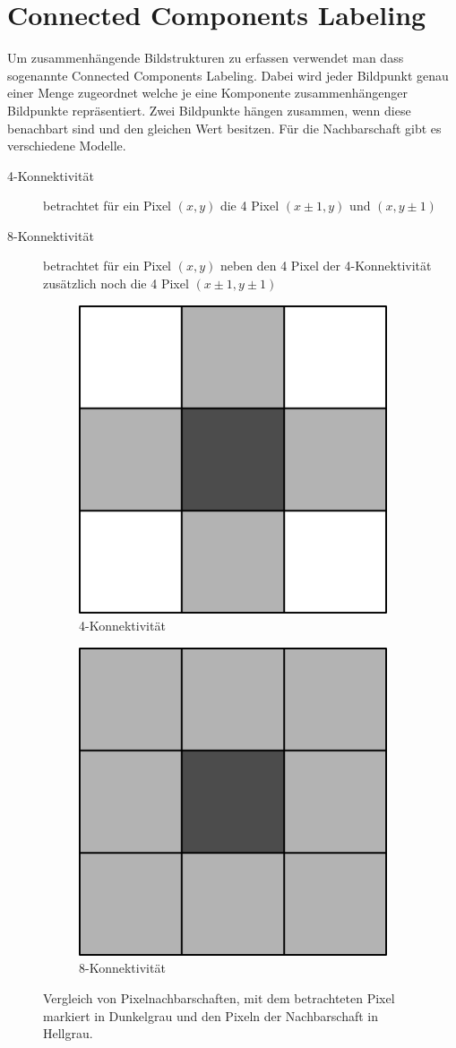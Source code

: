 \section{Connected Components Labeling}
\writtenby{\dcauthornameewie}%
Um zusammenhängende Bildstrukturen zu erfassen verwendet man dass sogenannte Connected Components Labeling.
Dabei wird jeder Bildpunkt genau einer Menge zugeordnet welche je eine Komponente zusammenhängenger Bildpunkte repräsentiert.
Zwei Bildpunkte hängen zusammen, wenn diese benachbart sind und den gleichen Wert besitzen.
Für die Nachbarschaft gibt es verschiedene Modelle.
%
\begin{description}
\item[4-Konnektivität] betrachtet für ein Pixel $(x,y)$ die 4 Pixel $(x\pm1,y)$ und $(x,y\pm1)$
\item[8-Konnektivität] betrachtet für ein Pixel $(x,y)$ neben den 4 Pixel der 4-Konnektivität zusätzlich noch die 4 Pixel $(x\pm1,y\pm1)$
\end{description}
%
\begin{figure}[H]
  \centering
  \begin{subfigure}{0.3\columnwidth}
    \centering
    \includegraphics[width=0.5\columnwidth]{img/basics/connected-compontents/4-connectivity}
    \caption{4-Konnektivität}
  \end{subfigure}
  \begin{subfigure}{0.3\columnwidth}
    \centering
    \includegraphics[width=0.5\columnwidth]{img/basics/connected-compontents/8-connectivity}
    \caption{8-Konnektivität}
  \end{subfigure}
  \caption[Vergleich von Pixelnachbarschaften]{Vergleich von Pixelnachbarschaften, mit dem betrachteten Pixel markiert in Dunkelgrau und den Pixeln der Nachbarschaft in Hellgrau.}
\end{figure}
